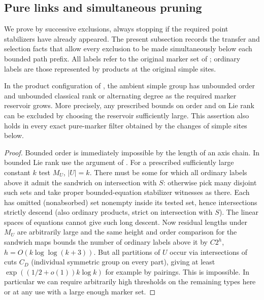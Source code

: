 \subsection{Pure links and simultaneous pruning}
\label{fa:links}
We prove  by successive exclusions, always stopping if the required point
stabilizers have already appeared.  The present subsection records the transfer and selection facts that
allow every exclusion to be made simultaneously below each bounded path prefix.  All labels refer to the
original marker set of ; ordinary labels are those represented by products at the
original simple sites.

\begin{lemma}\label{fa:bounded-types}
In the product configuration of , the ambient simple group has unbounded order and
unbounded classical rank or alternating degree as the required marker reservoir grows.  More precisely,
any prescribed bounds on order and on Lie rank can be excluded by choosing the reservoir sufficiently
large.  This assertion also holds in every exact pure-marker filter obtained by the changes of simple
sites below.
\end{lemma}

\begin{proof}

Bounded order is immediately impossible by the length of an axis chain. In bounded Lie rank use the
argument of . For a prescribed sufficiently large constant \(k\) test \(M_U\),
\(|U|=k\). There must be some for which all ordinary labels above it admit the sandwich on intersection
with \(S\): otherwise pick many disjoint such sets and take proper bounded-equation stabilizer witnesses
as there. Each has omitted (nonabsorbed) set nonempty inside its tested set, hence intersections strictly
descend (also ordinary products, strict on intersection with \(S\)). The linear spaces of equations
cannot give such long descent. Now residual lengths under \(M_U\) are arbitrarily large and the same
height and order comparison for the sandwich maps bounds the number of ordinary labels above it by
\(C2^{h}\), \(h=O(k\log\log(k+3))\). But all partitions of \(U\) occur via intersections of cuts \(C_D\)
(individual symmetric group on every part), giving at least \(\exp((1/2+o(1))k\log k)\) for example by
pairings. This is impossible. In particular we can require arbitrarily high thresholds on the remaining
types here or at any use with a large enough marker set.

\end{proof}

